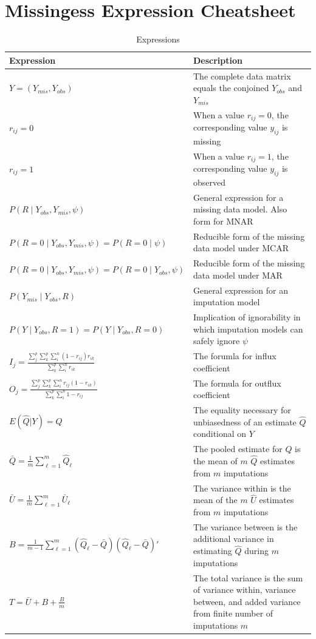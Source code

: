 \documentclass[12pt,oneside]{chicagocapstone}
\begin{document}
\chapter{Missingess Expression
Cheatsheet}\label{missingess-expression-cheatsheet}
\begin{longtabu} to 
\caption{\label{tab:appendixcexpressions}Expressions}\\
\toprule
\begingroup\fontsize{13}{15}\selectfont \textbf{Expression}\endgroup & \begingroup\fontsize{13}{15}\selectfont \textbf{Description}\endgroup\\
\midrule
$Y = (Y_{mis}, Y_{obs})$ & The complete data matrix equals the conjoined $Y_{obs}$ and $Y_{mis}$\\
$r_{ij} = 0$ & When a value $r_{ij}=0$, the corresponding value $y_{ij}$ is missing\\
$r_{ij} = 1$ & When a value $r_{ij}=1$, the corresponding value $y_{ij}$ is observed\\
$P(R\mid Y_{obs}, Y_{mis},\psi)$ & General expression for a missing data model. Also form for MNAR\\
$P(R=0\mid Y_{obs},Y_{mis},\psi) = P(R=0\mid \psi)$ & Reducible form of the missing data model under MCAR\\
\addlinespace
$P(R=0\mid Y_{obs},Y_{mis},\psi) = P(R=0\mid Y_{obs}, \psi)$ & Reducible form of the missing data model under MAR\\
$P(Y_{mis}\mid Y_{obs}, R)$ & General expression for an imputation model\\
$P(Y\mid Y_{obs}, R=1) = P(Y\mid Y_{obs}, R=0)$ & Implication of ignorability in which imputation models can safely ignore $\psi$\\
$I_j = \frac{\sum_j^p\sum_k^p\sum_i^n (1-r_{ij})r_{ik}}{\sum_k^p\sum_i^n r_{ik}}$ & The forumla for influx coefficient\\
$O_j = \frac{\sum_j^p\sum_k^p\sum_i^n r_{ij}(1-r_{ik})}{\sum_k^p\sum_i^n 1-r_{ij}}$ & The formula for outflux coefficient\\
\addlinespace
$E(\hat Q|Y) = Q$ & The equality necessary for unbiasedness of an estimate $\hat Q$ conditional on $Y$\\
$\bar Q = \frac{1}{m}\sum_{\ell=1}^m \hat Q_\ell$ & The pooled estimate for $Q$ is the mean of $m$ $\hat Q$ estimates from $m$ imputations\\
$\bar U = \frac{1}{m}\sum_{\ell=1}^m \bar U_\ell$ & The variance within is the mean of the $m$ $\hat U$ estimates from $m$ imputations\\
$B = \frac{1}{m-1}\sum_{\ell=1}^m (\hat Q_\ell-\bar Q)(\hat Q_\ell-\bar Q)'$ & The variance between is the additional variance in estimating $\hat Q$ during $m$ imputations\\
$T = \bar U + B + \frac{B}{m}$ & The total variance is the sum of variance within, variance between, and added variance from finite number of imputations $m$\\
\bottomrule
\end{longtabu}
\end{document}
